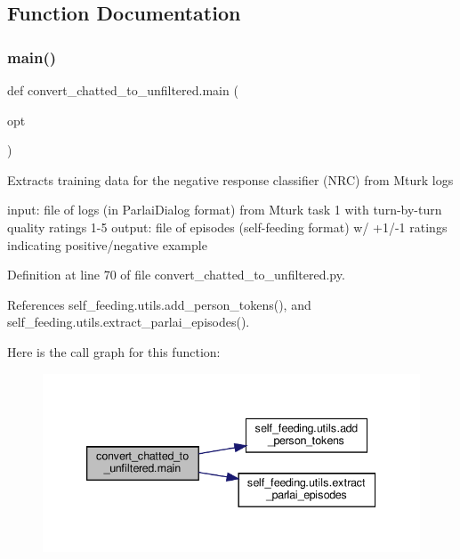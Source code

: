 \subsection{Function Documentation}
\mbox{\label{namespaceconvert__chatted__to__unfiltered_a0c087ccff61069c2691de5f9d7d45266}} 
\subsubsection{\texorpdfstring{main()}{main()}}
{\footnotesize\ttfamily def convert\+\_\+chatted\+\_\+to\+\_\+unfiltered.\+main (\begin{DoxyParamCaption}\item[{}]{opt }\end{DoxyParamCaption})}

\begin{DoxyVerb}Extracts training data for the negative response classifier (NRC) from Mturk logs

input: file of logs (in ParlaiDialog format) from Mturk task 1 with turn-by-turn
    quality ratings 1-5
output: file of episodes (self-feeding format) w/ +1/-1 ratings indicating
    positive/negative example
\end{DoxyVerb}
 

Definition at line 70 of file convert\+\_\+chatted\+\_\+to\+\_\+unfiltered.\+py.



References self\+\_\+feeding.\+utils.\+add\+\_\+person\+\_\+tokens(), and self\+\_\+feeding.\+utils.\+extract\+\_\+parlai\+\_\+episodes().

Here is the call graph for this function\+:
\nopagebreak
\begin{figure}[H]
\begin{center}
\leavevmode
\includegraphics[width=339pt]{namespaceconvert__chatted__to__unfiltered_a0c087ccff61069c2691de5f9d7d45266_cgraph}
\end{center}
\end{figure}
\mbox{\label{namespaceconvert__chatted__to__unfiltered_a693c3e8f97d34c4fe03e7694099fe41e}} 
